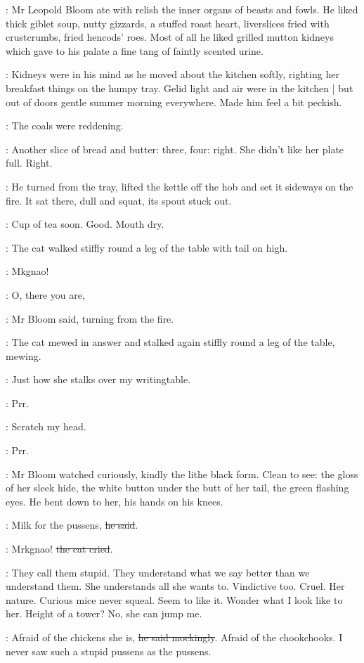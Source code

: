 :
Mr Leopold Bloom ate with relish
the inner organs of beasts and fowls.
He liked thick giblet soup,
nutty gizzards,
a stuffed roast heart,
liverslices fried with crustcrumbs,
fried hencods' roes.
Most of all
he liked grilled mutton kidneys
which gave to his palate
a fine tang of faintly scented urine.

:
Kidneys were in his mind
as he moved about the kitchen softly,
righting her breakfast things on the humpy tray.
Gelid light and air were in the kitchen |
but out of doors
gentle summer morning everywhere.
Made him feel a bit peckish.

:
The coals were reddening.

\BloomInt:
Another slice of bread and butter:
three, four: right.
She didn't like her plate full.
Right.

:
He turned from the tray,
lifted the kettle off the hob
and set it sideways on the fire.
It sat there,
dull and squat,
its spout stuck out.

\BloomInt:
Cup of tea soon.
Good.
Mouth dry.

:
The cat walked stiffly round a leg of the table
with tail on high.

\Cat:
Mkgnao!

\Bloom:
O, there you are,

:
Mr Bloom said, turning from the fire.

:
The cat mewed in answer
and stalked again stiffly round a leg of the table,
mewing.

\BloomInt:
Just how she stalks over my writingtable.

\Cat:
Prr.

\BloomInt:
Scratch my head.

\Cat:
Prr.

:
Mr Bloom watched curiously,
kindly
the lithe black form.
Clean to see:
the gloss of her sleek hide,
the white button under the butt of her tail,
the green flashing eyes.
He bent down to her,
his hands on his knees.

\Bloom:
Milk for the pussens,
\sout{he said}.

\Cat:
Mrkgnao!
\sout{the cat cried}.

\BloomInt:
They call them stupid.
They understand what we say
better than we understand them.
She understands all she wants to.
Vindictive too.
Cruel.
Her nature.
Curious mice never squeal.
Seem to like it.
Wonder what I look like to her.
Height of a tower?
No, she can jump me.

\Bloom:
Afraid of the chickens she is,
\sout{he said mockingly}.
Afraid of the chookchooks.
I never saw such a stupid pussens as the pussens.

